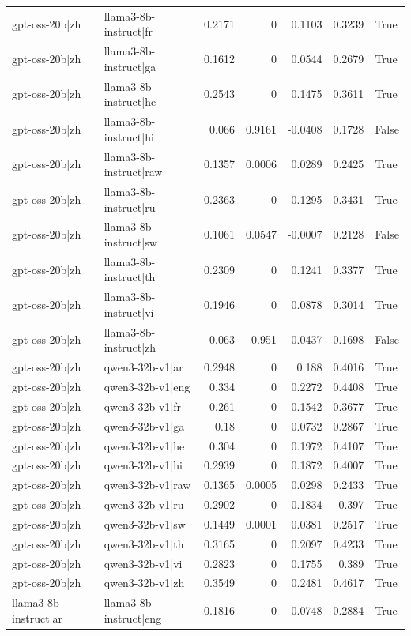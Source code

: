 \begin{table}
\begin{tabular}{l l r r r r l}
gpt-oss-20b|zh & llama3-8b-instruct|fr & 0.2171 & 0 & 0.1103 & 0.3239 & True \\
gpt-oss-20b|zh & llama3-8b-instruct|ga & 0.1612 & 0 & 0.0544 & 0.2679 & True \\
gpt-oss-20b|zh & llama3-8b-instruct|he & 0.2543 & 0 & 0.1475 & 0.3611 & True \\
gpt-oss-20b|zh & llama3-8b-instruct|hi & 0.066 & 0.9161 & -0.0408 & 0.1728 & False \\
gpt-oss-20b|zh & llama3-8b-instruct|raw & 0.1357 & 0.0006 & 0.0289 & 0.2425 & True \\
gpt-oss-20b|zh & llama3-8b-instruct|ru & 0.2363 & 0 & 0.1295 & 0.3431 & True \\
gpt-oss-20b|zh & llama3-8b-instruct|sw & 0.1061 & 0.0547 & -0.0007 & 0.2128 & False \\
gpt-oss-20b|zh & llama3-8b-instruct|th & 0.2309 & 0 & 0.1241 & 0.3377 & True \\
gpt-oss-20b|zh & llama3-8b-instruct|vi & 0.1946 & 0 & 0.0878 & 0.3014 & True \\
gpt-oss-20b|zh & llama3-8b-instruct|zh & 0.063 & 0.951 & -0.0437 & 0.1698 & False \\
gpt-oss-20b|zh & qwen3-32b-v1|ar & 0.2948 & 0 & 0.188 & 0.4016 & True \\
gpt-oss-20b|zh & qwen3-32b-v1|eng & 0.334 & 0 & 0.2272 & 0.4408 & True \\
gpt-oss-20b|zh & qwen3-32b-v1|fr & 0.261 & 0 & 0.1542 & 0.3677 & True \\
gpt-oss-20b|zh & qwen3-32b-v1|ga & 0.18 & 0 & 0.0732 & 0.2867 & True \\
gpt-oss-20b|zh & qwen3-32b-v1|he & 0.304 & 0 & 0.1972 & 0.4107 & True \\
gpt-oss-20b|zh & qwen3-32b-v1|hi & 0.2939 & 0 & 0.1872 & 0.4007 & True \\
gpt-oss-20b|zh & qwen3-32b-v1|raw & 0.1365 & 0.0005 & 0.0298 & 0.2433 & True \\
gpt-oss-20b|zh & qwen3-32b-v1|ru & 0.2902 & 0 & 0.1834 & 0.397 & True \\
gpt-oss-20b|zh & qwen3-32b-v1|sw & 0.1449 & 0.0001 & 0.0381 & 0.2517 & True \\
gpt-oss-20b|zh & qwen3-32b-v1|th & 0.3165 & 0 & 0.2097 & 0.4233 & True \\
gpt-oss-20b|zh & qwen3-32b-v1|vi & 0.2823 & 0 & 0.1755 & 0.389 & True \\
gpt-oss-20b|zh & qwen3-32b-v1|zh & 0.3549 & 0 & 0.2481 & 0.4617 & True \\
llama3-8b-instruct|ar & llama3-8b-instruct|eng & 0.1816 & 0 & 0.0748 & 0.2884 & True \\

\end{tabular}
\end{table}
